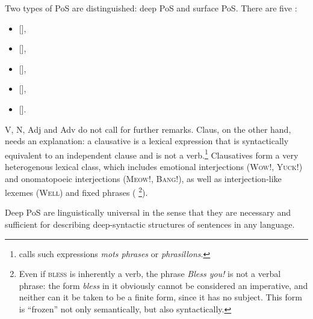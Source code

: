 Two types of PoS are distinguished: deep PoS and surface PoS. There are five :

\begin{itemize}

\item {} [],
\item {} [],
\item {} [],
\item {} [],
\item {} [].

\end{itemize}

V, N, Adj and Adv do not call for further remarks. Claus, on the other hand, needs an explanation: a clausative is a lexical expression that is syntactically equivalent to an independent clause and is not a verb.\footnote{\textcite[Ch.~45]{Tesniere1959} calls such expressions \textit{mots phrases} or \textit{phrasillons}.} \label{txt:Claus0}Clausatives form a very heterogenous lexical class, which includes emotional interjections (\textsc{Wow!}, \textsc{Yuck!}) and onomatopoeic interjections (\textsc{Meow!}, \textsc{Bang!}), as well as interjection-like lexemes (\textsc{Well}) and fixed phrases ( \footnote{Even if \textsc{bless} is inherently a verb, the phrase \textit{Bless you!} is not a verbal phrase: the form \textit{bless} in it obviously cannot be considered an imperative, and neither can it be taken to be a finite form, since it has no subject. This form is ``frozen'' not only semantically, but also syntactically.}).

Deep PoS are linguistically universal in the sense that they are necessary and sufficient for describing deep-syntactic structures of sentences in any language.

